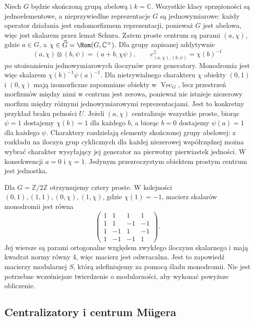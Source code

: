 \begin{przyklad}\label{cat:ex:tf-center-abelian-group}
Niech $G$ będzie skończoną grupą abelową i $k=\mathbb C$. Wszystkie klasy sprzężoności są jednoelementowe, a nieprzywiedlne reprezentacje $G$ są jednowymiarowe: każdy operator działania jest endomorfizmem reprezentacji, ponieważ $G$ jest abelowa, więc jest skalarem przez lemat Schura. Zatem proste centrum są parami $(a,\chi)$, gdzie $a\in G$, a $\chi\in\widehat G=\Hom(G,\mathbb C^\times)$. Dla grupy zapisanej addytywnie
\[
 (a,\chi)\otimes(b,\psi)=(a+b,\chi\psi),
 \qquad
 c^{\mathcal Z}_{(a,\chi),(b,\psi)}=\chi(b)^{-1}
\]
po utożsamieniu jednowymiarowych iloczynów przez generatory. Monodromia jest więc skalarem $\chi(b)^{-1}\psi(a)^{-1}$. Dla nietrywialnego charakteru $\chi$ obiekty $(0,1)$ i $(0,\chi)$ mają izomorficzne zapomniane obiekty w $\operatorname{Vec}_G$, lecz przestrzeń morfizmów między nimi w centrum jest zerowa, ponieważ nie istnieje niezerowy morfizm między różnymi jednowymiarowymi reprezentacjami. Jest to konkretny przykład braku pełności $U$. Jeżeli $(a,\chi)$ centralizuje wszystkie proste, biorąc $\psi=1$ dostajemy $\chi(b)=1$ dla każdego $b$, a biorąc $b=0$ dostajemy $\psi(a)=1$ dla każdego $\psi$. Charaktery rozdzielają elementy skończonej grupy abelowej: z rozkładu na iloczyn grup cyklicznych dla każdej niezerowej współrzędnej można wybrać charakter wysyłający jej generator na pierwotny pierwiastek jedności. W konsekwencji $a=0$ i $\chi=1$. Jedynym przezroczystym obiektem prostym centrum jest jednostka.

Dla $G=\mathbb Z/2\mathbb Z$ otrzymujemy cztery proste. W kolejności $(0,1),(1,1),(0,\chi),(1,\chi)$, gdzie $\chi(1)=-1$, macierz skalarów monodromii jest równa
\[
 \begin{pmatrix}
 1&1&1&1\\
 1&1&-1&-1\\
 1&-1&1&-1\\
 1&-1&-1&1
 \end{pmatrix}.
\]
Jej wiersze są parami ortogonalne względem zwykłego iloczynu skalarnego i mają kwadrat normy równy $4$, więc macierz jest odwracalna. Jest to zapowiedź macierzy modularnej $S$, którą zdefiniujemy za pomocą śladu monodromii. Nie jest potrzebne wcześniejsze twierdzenie o modularności, aby wykonać powyższe obliczenie.
\end{przyklad}

\subsection{Centralizatory i centrum Mügera}

